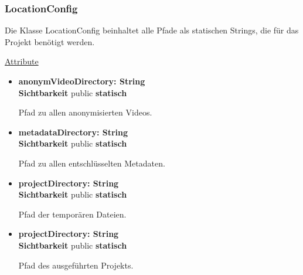 \subsubsection{LocationConfig} \label{service:klasse:LocationConfig}
Die Klasse LocationConfig beinhaltet alle Pfade als statischen Strings, die für das Projekt benötigt werden.\newline

\underline{Attribute}
\begin{itemize}
\itemsep0pt
\item \textbf{anonymVideoDirectory: String} \hfill\\ 
\textbf{Sichtbarkeit} public \newline
\textbf{statisch}

Pfad zu allen anonymisierten Videos.

\item \textbf{metadataDirectory: String} \hfill\\ 
\textbf{Sichtbarkeit} public \newline
\textbf{statisch}

Pfad zu allen entschlüsselten Metadaten.

\item \textbf{projectDirectory: String} \hfill\\ 
\textbf{Sichtbarkeit} public \newline
\textbf{statisch}

Pfad der temporären Dateien.

\item \textbf{projectDirectory: String} \hfill\\ 
\textbf{Sichtbarkeit} public \newline
\textbf{statisch}

Pfad des ausgeführten Projekts.
\end{itemize}